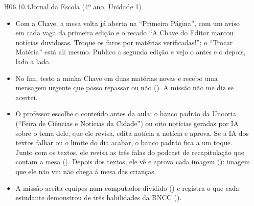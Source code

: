 \begin{historia}{H06.10.4}{Jornal da Escola (4º ano, Unidade 1)}{\parcial}
\begin{itemize}
    entre seis, de uma vez só ().
  \item Com a Chave, a mesa volta já aberta na \enquote{Primeira Página}, com
    um aviso em cada vaga da primeira edição e o recado \enquote{A Chave do
    Editor marcou notícias duvidosas. Troque os furos por matérias
    verificadas!}; o \enquote{Trocar Matéria} está ali mesmo. Publico a segunda
    edição e vejo o antes e o depois, lado a lado.
  \item No fim, testo a minha Chave em duas matérias novas e recebo uma
    mensagem urgente que posso repassar ou não (). A missão não me
    diz se acertei.
  \item O professor escolhe o conteúdo antes da aula: o banco padrão da Unooria
    (\enquote{Feira de Ciências e Notícias da Cidade}) ou oito notícias geradas
    por IA sobre o tema dele, que ele revisa, edita notícia a notícia e aprova.
    Se a IA dos textos falhar ou o limite do dia acabar, o banco padrão fica a
    um toque. Junto com os textos, ele revisa as três falas do podcast de
    recapitulação que contam a mesa (). Depois dos textos, ele vê
    e aprova cada imagem (): imagem que ele não viu não chega à
    mesa das crianças.
  \item A missão aceita equipes num computador dividido () e registra o
    que cada estudante demonstrou de três habilidades da BNCC ().
\end{itemize}
\end{historia}

